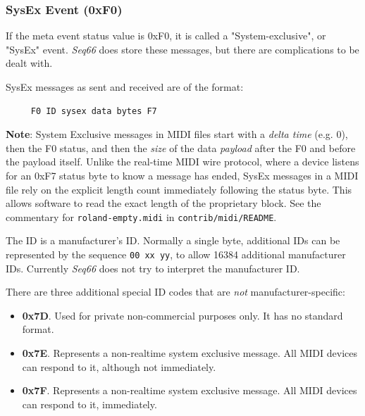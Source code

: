 \subsubsection{SysEx Event (0xF0)}
\label{subsubsec:midi_format_meta_sysex_event}

   If the meta event status value is 0xF0, it is called a "System-exclusive",
   or "SysEx" event.
   \textsl{Seq66} does store these messages, but there are complications
   to be dealt with.

   SysEx messages as sent and received are of the format:

   \begin{verbatim}
     F0 ID sysex data bytes F7
   \end{verbatim}

   \textbf{Note}:
      System Exclusive messages in MIDI files start with a
      \textsl{delta time} (e.g. 0), then the F0 status, and
      then the \textsl{size} of the data \textsl{payload} after the F0 and
      before the payload itself.  Unlike the real-time MIDI wire protocol,
      where a device listens for an 0xF7 status byte to know a message has
      ended, SysEx messages in a MIDI file rely on the explicit length count
      immediately following the status byte.
      This allows software to read the exact length of the proprietary
      block.
      See the commentary for
      \texttt{roland-empty.midi} in
      \texttt{contrib/midi/README}.

   The ID is a manufacturer's ID. Normally a single byte, additional IDs can be
   represented by the sequence \texttt{00 xx yy}, to allow 16384 additional
   manufacturer IDs.  Currently \textsl{Seq66} does not try to interpret the
   manufacturer ID.

   There are three additional special ID codes that are \textsl{not}
   manufacturer-specific:

   \begin{itemize}
      \item \textbf{0x7D}.
         Used for private non-commercial purposes only.
         It has no standard format.
      \item \textbf{0x7E}.
         Represents a non-realtime system exclusive message.
         All MIDI devices can respond to it, although not immediately.
      \item \textbf{0x7F}.
         Represents a non-realtime system exclusive message.
         All MIDI devices can respond to it, immediately.
   \end{itemize}

